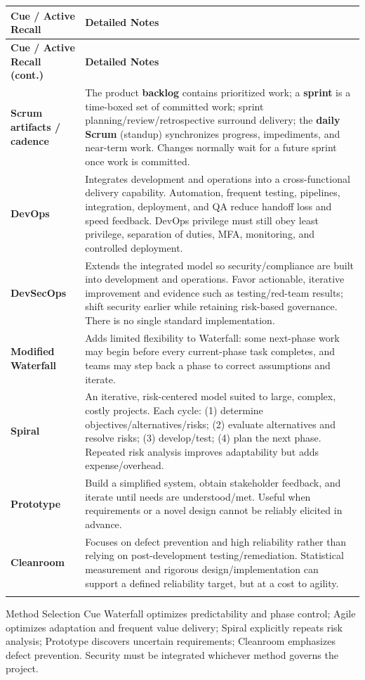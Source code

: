 \documentclass[10pt,letterpaper]{article}
\makeatletter
\newenvironment{cornell}{\rowcolors{2}{white}{notebg}\begin{longtable}{@{}>{\raggedright\arraybackslash\columncolor{cuebg}\color{navy}\bfseries}p{0.285\textwidth}>{\raggedright\arraybackslash}p{0.65\textwidth}@{}}\rowcolor{navy}\color{white}\textbf{Cue / Active Recall} & \color{white}\textbf{Detailed Notes}\\ \hline\endfirsthead\rowcolor{navy}\color{white}\textbf{Cue / Active Recall (cont.)} & \color{white}\textbf{Detailed Notes}\\ \hline\endhead}{\end{longtable}}
\newcommand{\noterow}[2]{#1 & #2\\\arrayrulecolor{line}\hline}\newcommand{\source}[1]{\par{\footnotesize\color{teal}\textit{Source: CBK, #1}}\par}
\makeatother
\begin{document}
\begin{cornell}
\noterow{Scrum artifacts / cadence}{The product \textbf{backlog} contains prioritized work; a \textbf{sprint} is a time-boxed set of committed work; sprint planning/review/retrospective surround delivery; the \textbf{daily Scrum} (standup) synchronizes progress, impediments, and near-term work. Changes normally wait for a future sprint once work is committed.}
\noterow{DevOps}{Integrates development and operations into a cross-functional delivery capability. Automation, frequent testing, pipelines, integration, deployment, and QA reduce handoff loss and speed feedback. DevOps privilege must still obey least privilege, separation of duties, MFA, monitoring, and controlled deployment.}
\noterow{DevSecOps}{Extends the integrated model so security/compliance are built into development and operations. Favor actionable, iterative improvement and evidence such as testing/red-team results; shift security earlier while retaining risk-based governance. There is no single standard implementation.}
\noterow{Modified Waterfall}{Adds limited flexibility to Waterfall: some next-phase work may begin before every current-phase task completes, and teams may step back a phase to correct assumptions and iterate.}
\noterow{Spiral}{An iterative, risk-centered model suited to large, complex, costly projects. Each cycle: (1) determine objectives/alternatives/risks; (2) evaluate alternatives and resolve risks; (3) develop/test; (4) plan the next phase. Repeated risk analysis improves adaptability but adds expense/overhead.}
\noterow{Prototype}{Build a simplified system, obtain stakeholder feedback, and iterate until needs are understood/met. Useful when requirements or a novel design cannot be reliably elicited in advance.}
\noterow{Cleanroom}{Focuses on defect prevention and high reliability rather than relying on post-development testing/remediation. Statistical measurement and rigorous design/implementation can support a defined reliability target, but at a cost to agility.}
\end{cornell}

\begin{exambox}{Method Selection Cue}
Waterfall optimizes predictability and phase control; Agile optimizes adaptation and frequent value delivery; Spiral explicitly repeats risk analysis; Prototype discovers uncertain requirements; Cleanroom emphasizes defect prevention. Security must be integrated whichever method governs the project.
\end{exambox}
\end{document}
